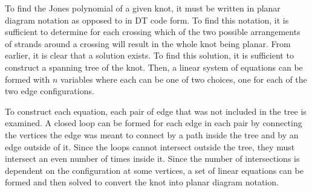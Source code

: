 \begin{paper}
To find the Jones polynomial of a given knot, it must be written in planar
diagram notation as opposed to in DT code form.
To find this notation, it is sufficient to determine for each crossing which of
the two possible arrangements of strands around a crossing will result in the
whole knot being planar.
From earlier, it is clear that a solution exists.
To find this solution, it is sufficient to construct a spanning tree of the knot.
Then, a linear system of equations can be formed with $n$ variables where each
can be one of two choices, one for each of the two edge configurations.

To construct each equation, each pair of edge that was not included in the tree
is examined.
A closed loop can be formed for each edge in each pair by connecting the
vertices the edge was meant to connect by a path inside the tree and by an edge
outside of it.
Since the loops cannot intersect outside the tree, they must intersect an even
number of times inside it.
Since the number of intersections is dependent on the configuration at some
vertices, a set of linear equations can be formed and then solved to convert the
knot into planar diagram notation.
\end{paper}

